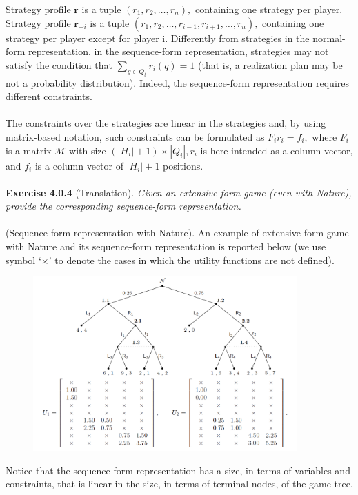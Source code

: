Strategy profile $\mathbf{r}$ is a tuple $\left(r_{1}, r_{2}, \ldots, r_{n}\right),$ containing one strategy per player. Strategy profile $\mathbf{r}_{-i}$ is a tuple $\left(r_{1}, r_{2}, \ldots, r_{i-1}, r_{i+1}, \ldots, r_{n}\right),$ containing one strategy per player except for player i.
Differently from strategies in the normal-form representation, in the sequence-form representation, strategies may not satisfy the condition that $\sum_{g \in Q_{t}} r_{i}(q)=1$ (that is, a realization plan may be not a probability distribution). Indeed, the sequence-form representation requires different constraints.\\\\
The constraints over the strategies are linear in the strategies and, by using matrix-based notation, such constraints can be formulated as $F_{i} r_{i}=f_{i},$ where $F_{i}$ is a matrix $\mathcal{M}$ with size $\left(\left|H_{i}\right|+1\right) \times\left|Q_{i}\right|, r_{i}$ is here intended as a column vector, and $f_{i}$ is a column vector of $\left|H_{i}\right|+1$ positions.\\\\
\textbf{Exercise 4.0.4} (Translation). \textit{Given an extensive-form game (even with Nature), provide the corresponding sequence-form representation.}\\\\
(Sequence-form representation with Nature). An example of extensive-form game with Nature and its sequence-form representation is reported below (we use symbol `$ \times $' to denote the cases in which the utility
functions are not defined).
\begin{figure}[H]
\centering
\includegraphics[width=0.9\textwidth]{images/img_1_4_01.png}
\end{figure}
\noindent
Notice that the sequence-form representation has a size, in terms of variables and constraints, that is linear in the size, in terms of terminal nodes, of the game tree.\\\\

